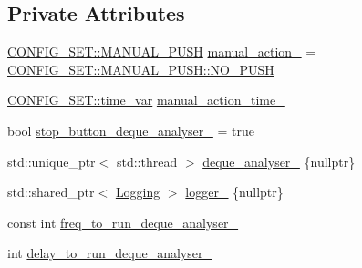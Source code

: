 \subsection*{Private Attributes}
\begin{DoxyCompactItemize}
\item 
\hyperlink{namespaceCONFIG__SET_a627706be626fd4e58c539ed120c27748}{C\+O\+N\+F\+I\+G\+\_\+\+S\+E\+T\+::\+M\+A\+N\+U\+A\+L\+\_\+\+P\+U\+SH} \hyperlink{classManualInteraction_ac271049856ad498238f794be25f62567}{manual\+\_\+action\+\_\+} = \hyperlink{namespaceCONFIG__SET_a627706be626fd4e58c539ed120c27748a201be4da83bb4099ea70c0fa017f69d5}{C\+O\+N\+F\+I\+G\+\_\+\+S\+E\+T\+::\+M\+A\+N\+U\+A\+L\+\_\+\+P\+U\+S\+H\+::\+N\+O\+\_\+\+P\+U\+SH}
\item 
\hyperlink{namespaceCONFIG__SET_a8816a22e7885d027a52bfa0d24fa9008}{C\+O\+N\+F\+I\+G\+\_\+\+S\+E\+T\+::time\+\_\+var} \hyperlink{classManualInteraction_accf9dcfcfad7a49a55c24a317d271eaa}{manual\+\_\+action\+\_\+time\+\_\+}
\item 
bool \hyperlink{classManualInteraction_a6f70c5fb6ba8b34a2c1af7be33164e06}{stop\+\_\+button\+\_\+deque\+\_\+analyser\+\_\+} = true
\item 
std\+::unique\+\_\+ptr$<$ std\+::thread $>$ \hyperlink{classManualInteraction_a46721312c5b254495e3b3ed7252fb246}{deque\+\_\+analyser\+\_\+} \{nullptr\}
\item 
std\+::shared\+\_\+ptr$<$ \hyperlink{classLogging}{Logging} $>$ \hyperlink{classManualInteraction_a0a8af39f1b2758f70c4162eaac6befdb}{logger\+\_\+} \{nullptr\}
\item 
const int \hyperlink{classManualInteraction_a2d033183cf7d8ad10325eeefce587b30}{freq\+\_\+to\+\_\+run\+\_\+deque\+\_\+analyser\+\_\+}
\item 
int \hyperlink{classManualInteraction_a8e06f10a945fba499533c43eadb8a5f8}{delay\+\_\+to\+\_\+run\+\_\+deque\+\_\+analyser\+\_\+}
\end{DoxyCompactItemize}
